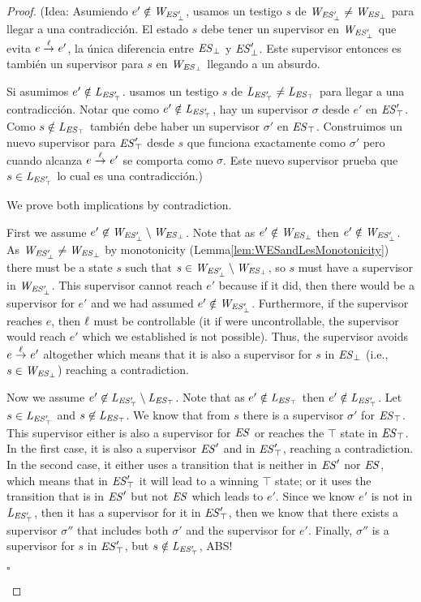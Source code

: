 \begin{proof}
	(Idea: Asumiendo $e' \notin \mathit{W_{\mathit{\mathit{ES}'_{\bot}}}}$, usamos un testigo $s$ de $\mathit{W_{\mathit{\mathit{ES}'_{\bot}}}} \neq 
	\mathit{W_{\mathit{\mathit{ES}_{\bot}}}}$ para llegar a una contradicción. El estado $s$ debe tener un supervisor en 
	$\mathit{W_{\mathit{\mathit{ES}'_{\bot}}}}$ que evita $e \overset{\ell}{\rightarrow}_{} e'$, la única diferencia entre $\mathit{\mathit{ES}_{\bot}}$ y $\mathit{\mathit{ES}'_{\bot}}$. Este supervisor entonces es también un supervisor para $s$ en $\mathit{W_{\mathit{\mathit{ES}_{\bot}}}}$ llegando a un absurdo. 
	
	Si asumimos $e' \notin \mathit{L_{\mathit{\mathit{ES}'_{\top}}}}$.  usamos un testigo $s$ de $\mathit{L_{\mathit{\mathit{ES}'_{\top}}}} \neq \mathit{L_{\mathit{\mathit{ES}_{\top}}}}$ para llegar a una contradicción. Notar que como $e' \notin \mathit{L_{\mathit{\mathit{ES}'_{\top}}}}$, hay un supervisor $\sigma$ desde $e'$ en  
	$\mathit{\mathit{ES}'_{\top}}$. Como $s \notin \mathit{L_{\mathit{\mathit{ES}_{\top}}}}$ también debe haber un supervisor $\sigma'$ en $\mathit{\mathit{ES}_{\top}}$. Construimos un nuevo supervisor para $\mathit{\mathit{ES}'_{\top}}$ desde $s$ que funciona exactamente como $\sigma'$ pero cuando alcanza $e \overset{\ell}{\rightarrow}_{} e'$ se comporta como $\sigma$. Este nuevo supervisor prueba que $s \in \mathit{L_{\mathit{\mathit{ES}'_{\top}}}}$ lo cual es una contradicción.)


We prove both implications by contradiction. 

First we assume $e' \not\in 
\mathit{W_{\mathit{\mathit{ES}'_{\bot}}}} \setminus \mathit{W_{\mathit{\mathit{ES}_{\bot}}}}$. Note that as $e' \notin \mathit{W_{\mathit{\mathit{ES}_{\bot}}}}$ then $e' 
\notin 
\mathit{W_{\mathit{\mathit{ES}'_{\bot}}}}$.  As $\mathit{W_{\mathit{\mathit{ES}'_{\bot}}}} \neq \mathit{W_{\mathit{\mathit{ES}_{\bot}}}}$ by monotonicity 
(Lemma\ref{lem:WESandLesMonotonicity}) there must be a state $s$ 
such that $s \in \mathit{W_{\mathit{\mathit{ES}'_{\bot}}}} \setminus 
\mathit{W_{\mathit{\mathit{ES}_{\bot}}}}$, so $s$ must have a supervisor in $\mathit{W_{\mathit{\mathit{ES}'_{\bot}}}} $. This supervisor 
cannot reach $e'$ because if it did, 
then there would be a supervisor for $e'$ and we had assumed $e' 
\notin \mathit{W_{\mathit{\mathit{ES}'_{\bot}}}}$. Furthermore, if the supervisor reaches $e$, then 
$\ell$ 
must be controllable (it if were uncontrollable, the supervisor would 
reach $e'$ which we established is not possible). Thus, the 
supervisor 
avoids $e \overset{\ell}{\rightarrow}_{} e'$ altogether which means that it is also a 
supervisor for $s$ in $\mathit{\mathit{ES}_{\bot}}$ (i.e.,  $s 
\in 
\mathit{W_{\mathit{\mathit{ES}_{\bot}}}}$) reaching a contradiction.

Now we assume $e' \not\in 
\mathit{L_{\mathit{\mathit{ES}'_{\top}}}} \setminus \mathit{L_{\mathit{\mathit{ES}_{\top}}}}$. Note that as $e' \notin \mathit{L_{\mathit{\mathit{ES}_{\top}}}}$ then $e' 
\notin 
\mathit{L_{\mathit{\mathit{ES}'_{\top}}}}$.  
 Let $s \in \mathit{L_{\mathit{\mathit{ES}'_{\top}}}}$ and $s \not\in \mathit{L_{\mathit{\mathit{ES}_{\top}}}}$. We know that from $s$ 
 there is a supervisor $\sigma'$ for 
 $\mathit{\mathit{ES}_{\top}}$. This supervisor either is also a 
 supervisor for $\mathit{ES}$ or reaches the $\top$ state in 
 $\mathit{\mathit{ES}_{\top}}$. In the first case, it is also a 
 supervisor $\mathit{ES}'$ and in $\mathit{\mathit{ES}'_{\top}}$, 
 reaching a contradiction. In the second case, it either uses a 
 transition that is neither in $\mathit{ES}'$ nor $\mathit{ES}$, which 
 means that in $\mathit{\mathit{ES}'_{\top}}$ it will lead to a 
 winning $\top$ state; or it uses the transition that is in 
 $\mathit{ES}'$ but not $\mathit{ES}$ which leads to $e'$. Since we 
 know $e'$ is not in $\mathit{L_{\mathit{\mathit{ES}'_{\top}}}}$, then it has a supervisor for it in 
 $\mathit{\mathit{ES}'_{\top}}$, then we know that there exists a 
 supervisor $\sigma''$ that includes both $\sigma'$ and the 
 supervisor for $e'$. Finally, $\sigma''$ is a supervisor for $s$ in 
 $\mathit{\mathit{ES}'_{\top}}$, but $s \notin \mathit{L_{\mathit{\mathit{ES}'_{\top}}}}$, ABS!	
\begin{flushright}
	$\square$
\end{flushright}
\end{proof}

